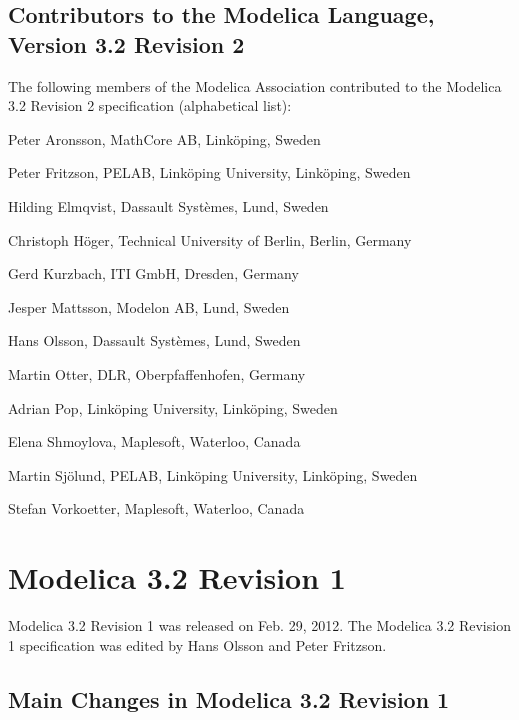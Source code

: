 \subsection{Contributors to the Modelica Language, Version 3.2 Revision 2}\label{contributors-to-the-modelica-language-version-3-2-revision-2}

The following members of the Modelica Association contributed to the
Modelica 3.2 Revision 2 specification (alphabetical list):

Peter Aronsson, MathCore AB, Linköping, Sweden

Peter Fritzson, PELAB, Linköping University, Linköping, Sweden

Hilding Elmqvist, Dassault Systèmes, Lund, Sweden

Christoph Höger, Technical University of Berlin, Berlin, Germany

Gerd Kurzbach, ITI GmbH, Dresden, Germany

Jesper Mattsson, Modelon AB, Lund, Sweden

Hans Olsson, Dassault Systèmes, Lund, Sweden

Martin Otter, DLR, Oberpfaffenhofen, Germany

Adrian Pop, Linköping University, Linköping, Sweden

Elena Shmoylova, Maplesoft, Waterloo, Canada

Martin Sjölund, PELAB, Linköping University, Linköping, Sweden

Stefan Vorkoetter, Maplesoft, Waterloo, Canada

\section{Modelica 3.2 Revision 1}\label{modelica-3-2-revision-1}

Modelica 3.2 Revision 1 was released on Feb. 29, 2012. The Modelica 3.2
Revision 1 specification was edited by Hans Olsson and Peter Fritzson.

\subsection{Main Changes in Modelica 3.2 Revision 1}\label{main-changes-in-modelica-3-2-revision-1}

